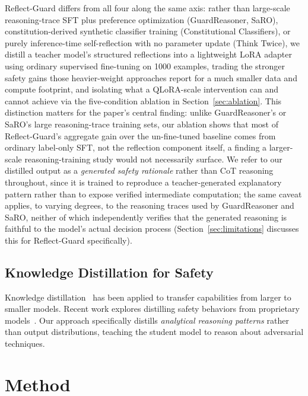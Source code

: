 \documentclass[superintelligence,article,accept,moreauthors]{Definitions/mdpi}
\renewcommand{\highlighting}[1]{#1}
\begin{document}
Reflect-Guard differs from all four along the same axis: rather than large-scale reasoning-trace SFT plus preference optimization (GuardReasoner, SaRO), constitution-derived synthetic classifier training (Constitutional Classifiers), or purely inference-time self-reflection with no parameter update (Think Twice), we distill a teacher model's structured reflections into a lightweight LoRA adapter using ordinary supervised fine-tuning on 1000 examples, trading the stronger safety gains those heavier-weight approaches report for a much smaller data and compute footprint, and isolating what a QLoRA-scale intervention can and cannot achieve via the five-condition ablation in Section~\ref{sec:ablation}. This distinction matters for the paper's central finding: unlike GuardReasoner's or SaRO's large reasoning-trace training sets, our ablation shows that most of Reflect-Guard's aggregate gain over the un-fine-tuned baseline comes from ordinary label-only SFT, not the reflection component itself, a finding a larger-scale reasoning-training study would not necessarily surface. We refer to our distilled output as a \emph{generated safety rationale} rather than CoT reasoning throughout, since it is trained to reproduce a teacher-generated explanatory pattern rather than to expose verified intermediate computation; the same caveat applies, to varying degrees, to the reasoning traces used by GuardReasoner and SaRO, neither of which independently verifies that the generated reasoning is faithful to the model's actual decision process (Section~\ref{sec:limitations} discusses this for Reflect-Guard specifically).

\subsection{\highlighting{Knowledge Distillation for Safety}}
Knowledge distillation~\citep{hinton2015distilling} has been applied to transfer capabilities from larger to smaller models. Recent work explores distilling safety behaviors from proprietary \mbox{models~\citep{tunstall2023zephyr}.} Our approach specifically distills \emph{analytical reasoning patterns} rather than output distributions, teaching the student model to reason about adversarial techniques.

\section{Method}
\label{sec:method}
\end{document}
